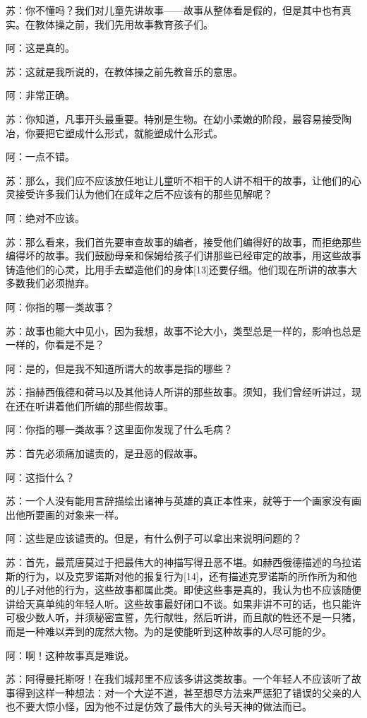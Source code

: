 \documentclass[12pt,oneside]{book}
\begin{document}
苏：你不懂吗？我们对儿童先讲故事——故事从整体看是假的，但是其中也有真实。在教体操之前，我们先用故事教育孩子们。

阿：这是真的。

苏：这就是我所说的，在教体操之前先教音乐的意思。

阿：非常正确。

苏：你知道，凡事开头最重要。特别是生物。在幼小柔嫩的阶段，最容易接受陶冶，你要把它塑成什么形式，就能塑成什么形式。

阿：一点不错。

苏：那么，我们应不应该放任地让儿童听不相干的人讲不相干的故事，让他们的心灵接受许多我们认为他们在成年之后不应该有的那些见解呢？

阿：绝对不应该。

苏：那么看来，我们首先要审查故事的编者，接受他们编得好的故事，而拒绝那些编得坏的故事。我们鼓励母亲和保姆给孩子们讲那些已经审定的故事，用这些故事铸造他们的心灵，比用手去塑造他们的身体[13]还要仔细。他们现在所讲的故事大多数我们必须抛弃。

阿：你指的哪一类故事？

苏：故事也能大中见小，因为我想，故事不论大小，类型总是一样的，影响也总是一样的，你看是不是？

阿：是的，但是我不知道所谓大的故事是指的哪些？

苏：指赫西俄德和荷马以及其他诗人所讲的那些故事。须知，我们曾经听讲过，现在还在听讲着他们所编的那些假故事。

阿：你指的哪一类故事？这里面你发现了什么毛病？

苏：首先必须痛加谴责的，是丑恶的假故事。

阿：这指什么？

苏：一个人没有能用言辞描绘出诸神与英雄的真正本性来，就等于一个画家没有画出他所要画的对象来一样。

阿：这些是应该谴责的。但是，有什么例子可以拿出来说明问题的？

苏：首先，最荒唐莫过于把最伟大的神描写得丑恶不堪。如赫西俄德描述的乌拉诺斯的行为，以及克罗诺斯对他的报复行为[14]，还有描述克罗诺斯的所作所为和他的儿子对他的行为，这些故事都属此类。即使这些事是真的，我认为也不应该随便讲给天真单纯的年轻人听。这些故事最好闭口不谈。如果非讲不可的话，也只能许可极少数人听，并须秘密宣誓，先行献牲，然后听讲，而且献的牲还不是一只猪，而是一种难以弄到的庞然大物。为的是使能听到这种故事的人尽可能的少。

阿：啊！这种故事真是难说。

苏：阿得曼托斯呀！在我们城邦里不应该多讲这类故事。一个年轻人不应该听了故事得到这样一种想法：对一个大逆不道，甚至想尽方法来严惩犯了错误的父亲的人也不要大惊小怪，因为他不过是仿效了最伟大的头号天神的做法而已。
\end{document}
